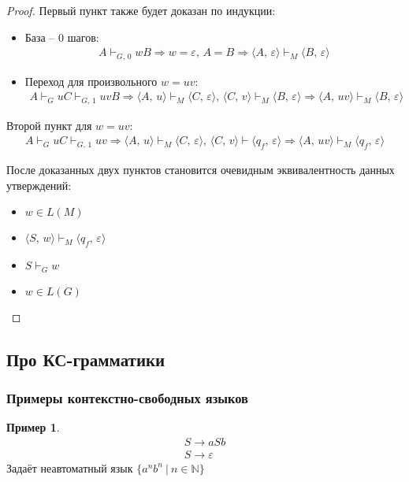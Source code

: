 \documentclass[a4paper,12pt]{article}
\theoremstyle{plain}
\theoremstyle{definition}
\newtheorem*{example}{Пример}
\theoremstyle{remark}
\begin{document}
\begin{proof}
	Первый пункт также будет доказан по индукции:
	\begin{itemize}
		\item База -- 0 шагов:
		      \begin{align*}
			      A \vdash_{G,\, 0} wB \Rightarrow w = \varepsilon,\, A = B \Rightarrow \langle A,\, \varepsilon\rangle \vdash_M \langle B,\, \varepsilon\rangle
		      \end{align*}
		\item Переход для произвольного $w = uv$:
		      \begin{align*}
			      A \vdash_G uC \vdash_{G,\,1} uvB \Rightarrow \langle A,\, u\rangle \vdash_M \langle C,\, \varepsilon\rangle,\, \langle C,\, v\rangle \vdash_M \langle B,\, \varepsilon\rangle \Rightarrow \langle A,\, uv\rangle \vdash_M \langle B,\, \varepsilon\rangle
		      \end{align*}
	\end{itemize}
	Второй пункт для $w = uv$:
	\begin{align*}
		A \vdash_G uC \vdash_{G,\,1} uv \Rightarrow \langle A,\, u\rangle \vdash_M \langle C,\, \varepsilon\rangle,\, \langle C,\, v\rangle \vdash \langle q_f,\, \varepsilon\rangle \Rightarrow \langle A,\, uv\rangle \vdash_M \langle q_f,\, \varepsilon\rangle
	\end{align*}

	После доказанных двух пунктов становится очевидным эквивалентность данных утверждений:
	\begin{itemize}
		\item $w \in L(M)$
		\item $\langle S,\, w\rangle \vdash_M \langle q_f,\, \varepsilon\rangle$
		\item $S \vdash_G w$
		\item $w \in L(G)$
	\end{itemize}
\end{proof}

\subsection{Про КС-грамматики}
\subsubsection*{Примеры контекстно-свободных языков}
\begin{example}
	\begin{align*}
		S \to aSb \\
		S \to \varepsilon
	\end{align*}
	Задаёт неавтоматный язык $\{a^nb^n \:|\: n \in \mathbb{N}\}$
\end{example}
\end{document}
